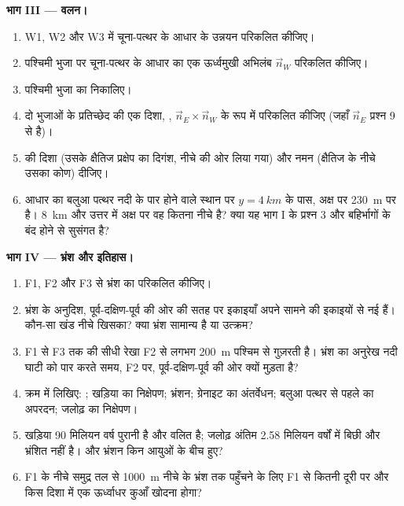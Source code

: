 \begin{problem}
\medskip
\noindent\textbf{भाग III --- वलन।}
\begin{enumerate}[resume]
  \item W1, W2 और W3 में चूना-पत्थर के आधार के उन्नयन परिकलित कीजिए।
  \item पश्चिमी भुजा पर चूना-पत्थर के आधार का एक ऊर्ध्वमुखी अभिलंब $\vec n_W$ परिकलित कीजिए।
  \item पश्चिमी भुजा का  निकालिए।
  \item दो भुजाओं के प्रतिच्छेद की एक दिशा, , $\vec n_E \times \vec n_W$ के रूप में परिकलित कीजिए (जहाँ $\vec n_E$ प्रश्न 9 से है)।
  \item {} की दिशा (उसके क्षैतिज प्रक्षेप का दिगंश, नीचे की ओर लिया गया) और नमन (क्षैतिज के नीचे उसका कोण) दीजिए।
  \item आधार का बलुआ पत्थर नदी के पार होने वाले स्थान पर $y = \qty{4}{km}$ के पास, अक्ष पर \qty{230}{m} पर है। \qty{8}{km}
        और उत्तर में अक्ष पर वह कितना नीचे है? क्या यह भाग I के प्रश्न 3 और बहिर्भागों के बंद होने से सुसंगत है?
\end{enumerate}

\medskip
\noindent\textbf{भाग IV --- भ्रंश और इतिहास।}
\begin{enumerate}[resume]
  \item F1, F2 और F3 से भ्रंश का  परिकलित कीजिए।
  \item भ्रंश के अनुदिश, पूर्व-दक्षिण-पूर्व की ओर की सतह पर इकाइयाँ अपने सामने की इकाइयों से नई हैं। कौन-सा खंड
        नीचे खिसका? क्या भ्रंश सामान्य है या उत्क्रम?
  \item F1 से F3 तक की सीधी रेखा F2 से लगभग \qty{200}{m} पश्चिम से गुज़रती है। भ्रंश का अनुरेख नदी घाटी को पार करते
        समय, F2 पर, पूर्व-दक्षिण-पूर्व की ओर क्यों मुड़ता है?
  \item क्रम में लिखिए: ; खड़िया का निक्षेपण; भ्रंशन; ग्रेनाइट का अंतर्वेधन; बलुआ पत्थर से पहले का अपरदन; जलोढ़ का
        निक्षेपण।
  \item खड़िया 90 मिलियन वर्ष पुरानी है और वलित है; जलोढ़ अंतिम 2.58 मिलियन वर्षों में बिछी
        और भ्रंशित नहीं है।  और भ्रंशन किन आयुओं के बीच हुए?
  \item F1 के नीचे समुद्र तल से \qty{1000}{m} नीचे के भ्रंश तक पहुँचने के लिए F1 से कितनी दूरी पर और किस दिशा में एक ऊर्ध्वाधर कुआँ खोदना होगा?
\end{enumerate}
\end{problem}

